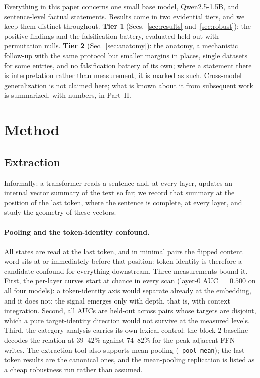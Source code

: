 \documentclass[11pt]{article}
\begin{document}
Everything in this paper concerns one small base model, Qwen2.5-1.5B, and
sentence-level factual statements. Results come in two evidential tiers, and
we keep them distinct throughout. \textbf{Tier 1} (Secs.~\ref{sec:results}
and~\ref{sec:robust}): the positive findings and the falsification battery,
evaluated held-out with permutation nulls. \textbf{Tier 2}
(Sec.~\ref{sec:anatomy}): the anatomy, a mechanistic follow-up with the same
protocol but smaller margins in places, single datasets for some entries, and
no falsification battery of its own; where a statement there is
interpretation rather than measurement, it is marked as such. Cross-model
generalization is not claimed here; what is known about it from subsequent
work is summarized, with numbers, in Part~II.

\section{Method}
\label{sec:method}

\subsection{Extraction}
\label{sec:extraction}

Informally: a transformer reads a sentence and, at every layer, updates an
internal vector summary of the text so far; we record that summary at the
position of the last token, where the sentence is complete, at every layer,
and study the geometry of these vectors.

\paragraph{Pooling and the token-identity confound.} All states are read
at the last token, and in minimal pairs the flipped content word sits at
or immediately before that position: token identity is therefore a
candidate confound for everything downstream. Three measurements bound
it. First, the per-layer curves start at chance in every scan (layer-$0$
AUC $= 0.500$ on all four models): a token-identity axis would separate
already at the embedding, and it does not; the signal emerges only with
depth, that is, with context integration. Second, all AUCs are held-out
across pairs whose targets are disjoint, which a pure target-identity
direction would not survive at the measured levels. Third, the category
analysis carries its own lexical control: the block-$2$ baseline decodes
the relation at $39$--$42\%$ against $74$--$82\%$ for the peak-adjacent
FFN writes. The extraction tool also supports mean pooling
(\texttt{--pool mean}); the last-token results are the canonical ones,
and the mean-pooling replication is listed as a cheap robustness run
rather than assumed.
\end{document}
